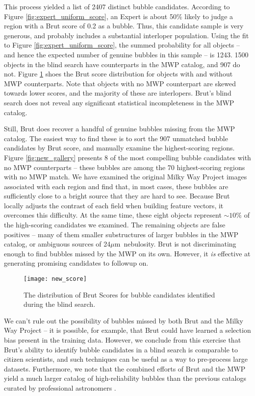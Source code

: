 \documentclass[preprint]{aastex}
\newcommand{\um}[0]{$\mu$m}
\begin{document}
This process yielded a list of 2407 distinct bubble candidates. According to Figure \ref{fig:expert_uniform_score}, an Expert is about 50\% likely to judge a region with a Brut score of 0.2 as a bubble. Thus, this candidate sample is very generous, and probably includes a substantial interloper population. Using the fit to Figure \ref{fig:expert_uniform_score}, the summed probability for all objects -- and hence the expected number of genuine bubbles in this sample -- is 1243. 1500 objects in the blind search have counterparts in the MWP catalog, and 907 do not. Figure \ref{fig:new_score} shoes the Brut score distribution for objects with and without MWP counterparts. Note that objects with no MWP counterpart are skewed towards lower scores, and the majority of these are interlopers. Brut's blind search does not reveal any significant statistical incompleteness in the MWP catalog.

Still, Brut does recover a handful of genuine bubbles missing from the MWP catalog. The easiest way to find these is to sort the 907 unmatched bubble candidates by Brut score, and manually examine the highest-scoring regions. Figure \ref{fig:new_gallery} presents 8 of the most compelling bubble candidates with no MWP counterparts -- these bubbles are among the 70 highest-scoring regions with no MWP match. We have examined the original Milky Way Project images associated with each region and find that, in most cases, these bubbles are sufficiently close to a bright source that they are hard to see. Because Brut locally adjusts the contrast of each field when building feature vectors, it overcomes this difficulty. At the same time, these eight objects represent $\sim 10\%$ of the high-scoring candidates we examined. The remaining objects are false positives -- many of them smaller substructures of larger bubbles in the MWP catalog, or ambiguous sources of 24\um\, nebulosity. Brut is not discriminating enough to find bubbles missed by the MWP on its own. However, it \textit{is} effective at generating promising candidates to followup on.

\begin{figure}[h!]
\texttt{[image: new\_score]}
\caption{The distribution of Brut Scores for bubble candidates identified during the blind search.}
\label{fig:new_score}
\end{figure}

We can't rule out the possibility of bubbles missed by both Brut and the Milky Way Project -- it is possible, for example, that Brut could have learned a selection bias present in the training data. However, we conclude from this exercise that Brut's ability to identify bubble candidates in a blind search is comparable to citizen scientists, and such techniques can be useful as a way to pre-process large datasets. Furthermore, we note that the combined efforts of Brut and the MWP yield a much larger catalog of high-reliability bubbles than the previous catalogs curated by professional astronomers \citep{Churchwell06, Churchwell07}. 
\end{document}
